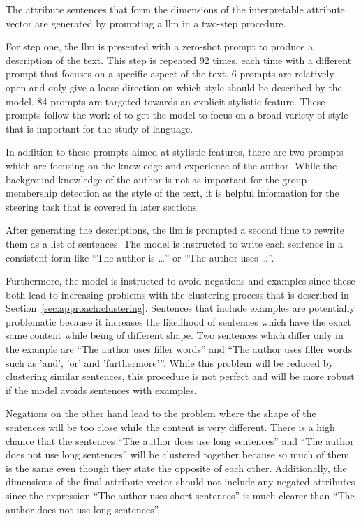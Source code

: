 The attribute sentences that form the dimensions of the interpretable attribute vector are generated by prompting a \acl{llm} in a two-step procedure.

For step one, the \ac{llm} is presented with a zero-shot prompt to produce a description of the text. This step is repeated 92 times, each time with a different prompt that focuses on a specific aspect of the text. 6 prompts are relatively open and only give a loose direction on which style should be described by the model. 84 prompts are targeted towards an explicit stylistic feature. These prompts follow the work of \citet{patelLearningInterpretableStyle2023,tausczikPsychologicalMeaningWords2010} to get the model to focus on a broad variety of style that is important for the study of language.

In addition to these prompts aimed at stylistic features, there are two prompts which are focusing on the knowledge and experience of the author. While the background knowledge of the author is not as important for the group membership detection as the style of the text, it is helpful information for the steering task that is covered in later sections.

After generating the descriptions, the \ac{llm} is prompted a second time to rewrite them as a list of sentences. The model is instructed to write each sentence in a consistent form like \enquote{The author is \ldots} or \enquote{The author uses \ldots}.

Furthermore, the model is instructed to avoid negations and examples since these both lead to increasing problems with the clustering process that is described in Section~\ref{sec:approach:clustering}.
Sentences that include examples are potentially problematic because it increases the likelihood of sentences which have the exact same content while being of different shape. %
Two sentences which differ only in the example are \enquote{The author uses filler words} and \enquote{The author uses filler words such as 'and', 'or' and 'furthermore'}. While this problem will be reduced by clustering similar sentences, this procedure is not perfect and will be more robust if the model avoids sentences with examples.

Negations on the other hand lead to the problem where the shape of the sentences will be too close while the content is very different. There is a high chance that the sentences \enquote{The author does use long sentences} and \enquote{The author does not use long sentences} will be clustered together because so much of them is the same even though they state the opposite of each other.
Additionally, the dimensions of the final attribute vector should not include any negated attributes since the expression \enquote{The author uses short sentences} is much clearer than \enquote{The author does not use long sentences}.

